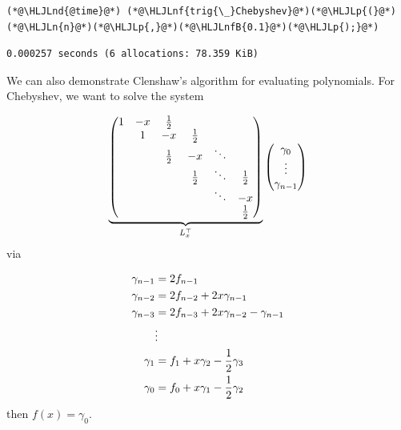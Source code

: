 \documentclass[12pt,a4paper]{article}
\newcommand{\HLJLn}[1]{#1}
\newcommand{\HLJLnd}[1]{\textcolor[RGB]{214,102,97}{#1}}
\newcommand{\HLJLnf}[1]{\textcolor[RGB]{66,102,213}{#1}}
\newcommand{\HLJLnfB}[1]{\textcolor[RGB]{59,151,46}{#1}}
\newcommand{\HLJLp}[1]{#1}
\def\half{ {1 \over 2} }
\begin{document}
\begin{lstlisting}
(*@\HLJLnd{@time}@*) (*@\HLJLnf{trig{\_}Chebyshev}@*)(*@\HLJLp{(}@*)(*@\HLJLn{n}@*)(*@\HLJLp{,}@*)(*@\HLJLnfB{0.1}@*)(*@\HLJLp{);}@*)
\end{lstlisting}

\begin{lstlisting}
0.000257 seconds (6 allocations: 78.359 KiB)
\end{lstlisting}


We can also demonstrate Clenshaw's algorithm for evaluating polynomials. For Chebyshev, we want to solve the system

\[
\underbrace{\begin{pmatrix}
1 & -x & \half \\
& 1 & -x & \half  \\
& & \half & -x & \ddots  \\
& &     & \half & \ddots & \half \\
&&&&\ddots & -x \\
&&&&& \half
\end{pmatrix}}_{L_x^\top} \begin{pmatrix} \gamma_0 \\\vdots\\ \gamma_{n-1} \end{pmatrix}
\]
via


\begin{align*}
\gamma_{n-1} &= 2f_{n-1} \\
\gamma_{n-2} &= 2f_{n-2} + 2x \gamma_{n-1} \\
\gamma_{n-3} &= 2 f_{n-3} + 2x \gamma_{n-2} - \gamma_{n-1} \\
& \vdots \\
\gamma_1 &= f_1 + x \gamma_2 - \half \gamma_3 \\
\gamma_0 &= f_0 + x \gamma_1 - \half \gamma_2
\end{align*}
then $f(x) = \gamma_0$.
\end{document}
